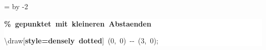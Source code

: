 \begingroup
\ttfamily
{}
=\textwidth
\advance{} by -2\fboxsep
\noindent
\colorbox{background}
{%
\parbox{\dimen255}
{%
\rule[-0.5ex]{0pt}{2.5ex}\hspace*{0.0em}\textcolor{G}{\textbf{\%~gepunktet~mit~kleineren~Abstaenden}}\\
\rule[-0.5ex]{0pt}{2.5ex}\hspace*{0.0em}\textbackslash{}draw[\textcolor{R}{\textbf{style=densely~dotted}}]~(0,~0)~{-}{-}~(3,~0);}%
}%
\endgroup
